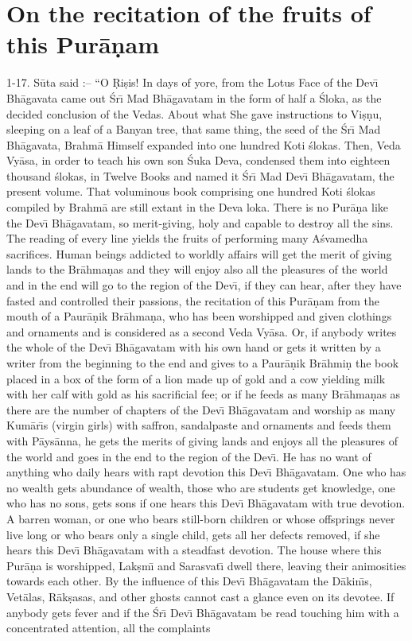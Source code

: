 \chapter{On the recitation of the fruits of this Pur\=a\d{n}am}

1-17. S\=uta said :-- ``O \d{R}i\d{s}is! In days of yore, from the Lotus Face of the Dev\={\i} Bh\=agavata came out \'Sr\={\i} Mad Bh\=agavatam in the form of half a \'Sloka, as the decided conclusion of the Vedas. About what She gave instructions to Vi\d{s}\d{n}u, sleeping on a leaf of a Banyan tree, that same thing, the seed of the \'Sr\={\i} Mad Bh\=agavata, Brahm\=a Himself expanded into one hundred Koti \'slokas. Then, Veda Vy\=asa, in order to teach his own son \'Suka Deva, condensed them into eighteen thousand \'slokas, in Twelve Books and named it \'Sr\={\i} Mad Dev\={\i} Bh\=agavatam, the present volume. That voluminous book comprising one hundred Koti \'slokas compiled by Brahm\=a are still extant in the Deva loka. There is no Pur\=a\d{n}a like the Dev\={\i} Bh\=agavatam, so merit-giving, holy and capable to destroy all the sins. The reading of every line yields the fruits of performing many A\'svamedha sacrifices. Human beings addicted to worldly affairs will get the merit of giving lands to the Br\=ahma\d{n}as and they will enjoy also all the pleasures of the world and in the end will go to the region of the Dev\={\i}, if they can hear, after they have fasted and controlled their passions, the recitation of this Pur\=a\d{n}am from the mouth of a Paur\=a\d{n}ik Br\=ahma\d{n}a, who has been worshipped and given clothings and ornaments and is considered as a second Veda Vy\=asa. Or, if anybody writes the whole of the Dev\={\i} Bh\=agavatam with his own hand or gets it written by a writer from the beginning to the end and gives to a Paur\=a\d{n}ik Br\=ahmi\d{n} the book placed in a box of the form of a lion made up of gold and a cow yielding milk with her calf with gold as his sacrificial fee; or if he feeds as many Br\=ahma\d{n}as as there are the number of chapters of the Dev\={\i} Bh\=agavatam and worship as many Kum\=ar\={\i}s (virgin girls) with saffron, sandalpaste and ornaments and feeds them with P\=ays\=anna, he gets the merits of giving lands and enjoys all the pleasures of the world and goes in the end to the region of the Dev\={\i}. He has no want of anything who daily hears with rapt devotion this Dev\={\i} Bh\=agavatam. One who has no wealth gets abundance of wealth, those who are students get knowledge, one who has no sons, gets sons if one hears this Dev\={\i} Bh\=agavatam with true devotion. A barren woman, or one who bears still-born children or whose offsprings never live long or who bears only a single child, gets all her defects removed, if she hears this Dev\={\i} Bh\=agavatam with a steadfast devotion. The house where this Pur\=a\d{n}a is worshipped, Lak\d{s}m\={\i} and Sarasvat\={\i} dwell there, leaving their animosities towards each other. By the influence of this Dev\={\i} Bh\=agavatam the D\=akin\={\i}s, Vet\=alas, R\=ak\d{s}asas, and other ghosts cannot cast a glance even on its devotee. If anybody gets fever and if the \'Sr\={\i} Dev\={\i} Bh\=agavatam be read touching him with a concentrated attention, all the complaints 